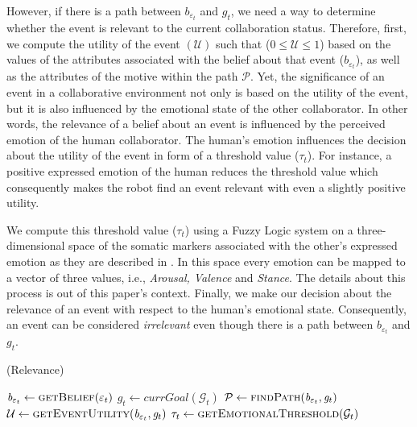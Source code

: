 \documentclass[letterpaper]{article}
\begin{document}
However, if there is a path between $\mathit{b}_{\varepsilon_t}$ and $g_{t}$, we
need a way to determine whether the event is relevant to the current
collaboration status. Therefore, first, we compute the utility of the event
$(\mathcal{U})$ such that ($0 \leq \mathcal{U} \leq 1$) based on the values of
the attributes associated with the belief about that event
($\mathit{b}_{\varepsilon_t}$), as well as the attributes of the motive within
the path $\mathcal{P}$. Yet, the significance of an event in a collaborative
environment not only is based on the utility of the event, but it is also
influenced by the emotional state of the other collaborator. In other words, the
relevance of a belief about an event is influenced by the perceived emotion of
the human collaborator. The human's emotion influences the decision about the
utility of the event in form of a threshold value ($\tau_{t}$). For instance, a
positive expressed emotion of the human reduces the threshold value which
consequently makes the robot find an event relevant with even a slightly
positive utility.

We compute this threshold value ($\tau_{t}$) using a Fuzzy Logic system on a
three-dimensional space of the somatic markers associated with the other's
expressed emotion as they are described in \cite{breazeal:sociable-robot}. In
this space every emotion can be mapped to a vector of three values, i.e.,
\textit{Arousal, Valence} and \textit{Stance}. The details about this process is
out of this paper's context. Finally, we make our decision about the relevance
of an event with respect to the human's emotional state. Consequently, an event
can be considered \textit{irrelevant} even though there is a path between
$\mathit{b}_{\varepsilon_t}$ and $g_{t}$.

\begin{algorithm}
	\caption{(Relevance)}
	\label{alg:relevance}
	\begin{algorithmic}[1]
			\Statex
			\State $\mathit{b}_{\varepsilon_t} \gets \Call{getBelief}{\varepsilon_t}$
			\State $\mathit{g}_{t} \gets \textit{currGoal}{(\mathcal{G}_{t})}$
			\Statex
			\State $\mathcal{P} \gets \Call{findPath}{\mathit{b}_{\varepsilon_t},
			\mathit{g}_{t}}$
			\Statex
				\State {}
			\Else
				\State $\mathcal{U} \gets \Call{getEventUtility}{\mathit{b}_{\varepsilon_t},
				\mathit{g}_{t}}$ 
				\State $\tau_{t} \gets \Call{getEmotionalThreshold}{\mathcal{G}_{t}}$
				\State {}
				\Else
					\State {}
				\EndIf
			\EndIf
		\EndFunction
	\end{algorithmic}
\end{algorithm}
\end{document}
